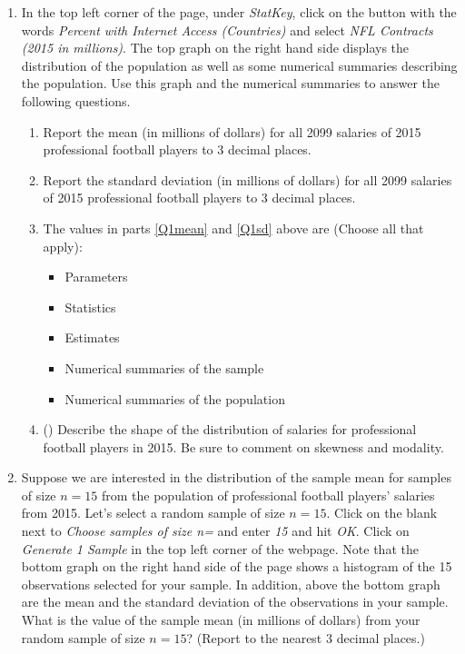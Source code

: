 \begin{enumerate}

  \item \label{Q1} In the top left corner of the page, under \textit{StatKey}, click on the button with the words \textit{Percent with Internet Access (Countries)} 
    and select \textit{NFL Contracts (2015 in millions)}.  The top graph on the right hand side displays the distribution of the population as well as some numerical summaries describing the population.  Use this graph and the numerical summaries to answer the following questions.
	\begin{enumerate}
	\item\label{Q1mean} Report the mean (in millions of dollars) for all 2099 salaries of 2015 professional football players to 3 decimal places.
	\item\label{Q1sd} Report the standard deviation (in millions of dollars) for all 2099 salaries of 2015 professional football players to 3 decimal places.
	\item The values in parts \ref{Q1mean} and \ref{Q1sd} above are (Choose all that apply):
		\begin{itemize}
		\item Parameters
		\item Statistics
		\item Estimates
		\item Numerical summaries of the sample
		\item Numerical summaries of the population
		\end{itemize}
	\item (\textbf{})  Describe the shape of the distribution of salaries for professional football players in 2015.  Be sure to comment on skewness and modality.\\
	\end{enumerate}


\item \label{samp1} Suppose we are interested in the distribution of the sample mean for samples of size $n=15$ from the population of professional football players' salaries from 2015. Let's select a random sample of size $n=15$.   Click on the blank next to \textit{Choose samples of size n=} and enter \textit{15} and hit \textit{OK}.  Click on \textit{Generate 1 Sample} in the top left corner of the webpage.  Note that the bottom graph on the right hand side of the page shows a histogram of the 15 observations selected for your sample.  In addition, above the bottom graph are the mean and the standard deviation of the observations in your sample.  What is the value of the sample mean (in millions of dollars) from your random sample of size $n=15$?  (Report to the nearest 3 decimal places.)\\


\end{enumerate}
